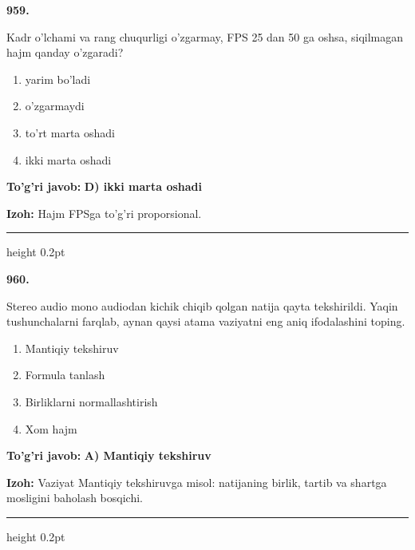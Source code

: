 \documentclass[10pt,a4paper,oneside]{article}
\begin{document}
\noindent\textbf{\color{ink}959.}
\par
Kadr o'lchami va rang chuqurligi o'zgarmay, FPS 25 dan 50 ga oshsa, siqilmagan hajm qanday o'zgaradi?
\begin{enumerate}[label=\Alph*),leftmargin=9mm]
\item yarim bo'ladi
\item o'zgarmaydi
\item to'rt marta oshadi
\item ikki marta oshadi
\end{enumerate}
\begin{tcolorbox}[enhanced,breakable,colback=teal!4,colframe=teal!50!black,boxrule=0.5pt,arc=1.1mm,left=3mm,right=3mm,top=1.7mm,bottom=1.7mm,before skip=2mm,after skip=2mm]
\textbf{\color{teal}To'g'ri javob:} \textbf{D) ikki marta oshadi}
\par\smallskip
\textbf{Izoh:} Hajm FPSga to'g'ri proporsional.
\end{tcolorbox}
\vspace{2mm}\hrule height 0.2pt \vspace{3mm}

\noindent\textbf{\color{ink}960.}
\par
Stereo audio mono audiodan kichik chiqib qolgan natija qayta tekshirildi. Yaqin tushunchalarni farqlab, aynan qaysi atama vaziyatni eng aniq ifodalashini toping.
\begin{enumerate}[label=\Alph*),leftmargin=9mm]
\item Mantiqiy tekshiruv
\item Formula tanlash
\item Birliklarni normallashtirish
\item Xom hajm
\end{enumerate}
\begin{tcolorbox}[enhanced,breakable,colback=teal!4,colframe=teal!50!black,boxrule=0.5pt,arc=1.1mm,left=3mm,right=3mm,top=1.7mm,bottom=1.7mm,before skip=2mm,after skip=2mm]
\textbf{\color{teal}To'g'ri javob:} \textbf{A) Mantiqiy tekshiruv}
\par\smallskip
\textbf{Izoh:} Vaziyat Mantiqiy tekshiruvga misol: natijaning birlik, tartib va shartga mosligini baholash bosqichi.
\end{tcolorbox}
\vspace{2mm}\hrule height 0.2pt \vspace{3mm}
\end{document}
